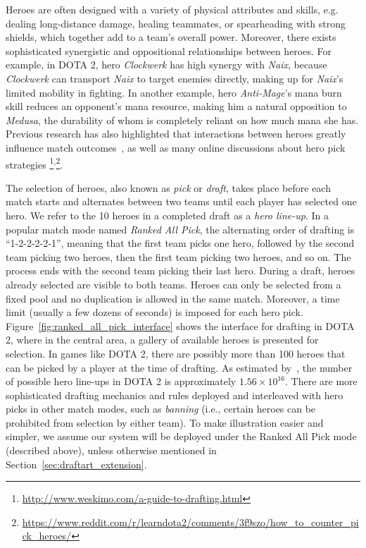 Heroes are often designed with a variety of physical attributes and skills, e.g. dealing long-distance damage, healing teammates, or spearheading with strong shields, which together add to a team's overall power. Moreover, there exists sophisticated synergistic and oppositional relationships between heroes. For example, in DOTA 2, hero \textit{Clockwerk} has high synergy with \textit{Naix}, because \textit{Clockwerk} can transport \textit{Naix} to target enemies directly, making up for \textit{Naix}'s limited mobility in fighting. In another example, hero \textit{Anti-Mage}'s mana burn skill reduces an opponent's mana resource, making him a natural opposition to \textit{Medusa}, the durability of whom is completely reliant on how much mana she has. Previous research has also highlighted that interactions between heroes greatly influence match outcomes~\citep{pobie1,Semenov2016,kim2016proficiency}, as well as many online discussions about hero pick strategies \footnote{\url{http://www.weskimo.com/a-guide-to-drafting.html}}\textsuperscript{,}\footnote{\url{https://www.reddit.com/r/learndota2/comments/3f9szo/how_to_counter_pick_heroes/}}. 
 
 
The selection of heroes, also known as \textit{pick} or \textit{draft}, takes place before each match starts and alternates between two teams until each player has selected one hero. We refer to the 10 heroes in a completed draft as a \textit{hero line-up}. In a popular match mode named \textit{Ranked All Pick}, the alternating order of drafting is ``1-2-2-2-2-1'', meaning that the first team picks one hero, followed by the second team picking two heroes, then the first team picking two heroes, and so on. The process ends with the second team picking their last hero. During a draft, heroes already selected are visible to both teams. Heroes can only be selected from a fixed pool and no duplication is allowed in the same match. Moreover, a time limit (usually a few dozens of seconds) is imposed for each hero pick. Figure~\ref{fig:ranked_all_pick_interface} shows the interface for drafting in DOTA 2, where in the central area, a gallery of available heroes is presented for selection. In games like DOTA 2, there are possibly more than 100 heroes that can be picked by a player at the time of drafting. As estimated by~\textcite{hanke2017reco}, the number of possible hero line-ups in DOTA 2 is approximately $1.56 \times 10^{16}$. There are more sophisticated drafting mechanics and rules deployed and interleaved with hero picks in other match modes, such as \textit{banning} (i.e., certain heroes can be prohibited from selection by either team). To make illustration easier and simpler, we assume our system will be deployed under the Ranked All Pick mode (described above), unless otherwise mentioned in Section~\ref{sec:draftart_extension}.

